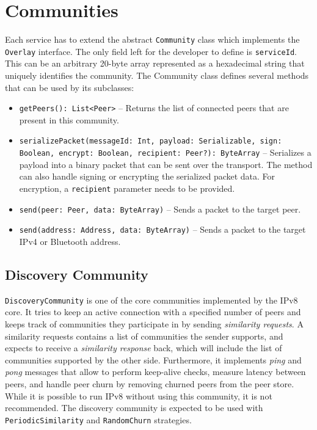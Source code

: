 \section{Communities}

Each service has to extend the abstract \texttt{Community} class which implements the \texttt{Overlay} interface. The only field left for the developer to define is \texttt{serviceId}. This can be an arbitrary 20-byte array represented as a hexadecimal string that uniquely identifies the community. The Community class defines several methods that can be used by its subclasses:

\begin{itemize}
    \item \texttt{getPeers(): List<Peer>} – Returns the list of connected peers that are present in this community.
    \item \texttt{serializePacket(messageId: Int, payload: Serializable, sign: Boolean, encrypt: Boolean, recipient: Peer?): ByteArray} – Serializes a payload into a binary packet that can be sent over the transport. The method can also handle signing or encrypting the serialized packet data. For encryption, a \texttt{recipient} parameter needs to be provided.
    \item \texttt{send(peer: Peer, data: ByteArray)} – Sends a packet to the target peer.
    \item \texttt{send(address: Address, data: ByteArray)} – Sends a packet to the target IPv4 or Bluetooth address.
\end{itemize}

\subsection{Discovery Community}

\texttt{DiscoveryCommunity} is one of the core communities implemented by the IPv8 core. It tries to keep an active connection with a specified number of peers and keeps track of communities they participate in by sending \textit{similarity requests}. A similarity requests contains a list of communities the sender supports, and expects to receive a \textit{similarity response} back, which will include the list of communities supported by the other side. Furthermore, it implements \textit{ping} and \textit{pong} messages that allow to perform keep-alive checks, measure latency between peers, and handle peer churn by removing churned peers from the peer store. While it is possible to run IPv8 without using this community, it is not recommended. The discovery community is expected to be used with \texttt{PeriodicSimilarity} and \texttt{RandomChurn} strategies.


